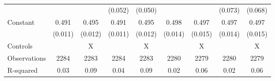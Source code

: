 {\begin{tabular}{l*{8}{c}}
                    &                     &                     &     (0.052)         &     (0.050)         &                     &                     &     (0.073)         &     (0.068)         \\
Constant            &       0.491\sym{***}&       0.495\sym{***}&       0.491\sym{***}&       0.495\sym{***}&       0.498\sym{***}&       0.497\sym{***}&       0.497\sym{***}&       0.497\sym{***}\\
                    &     (0.011)         &     (0.012)         &     (0.011)         &     (0.012)         &     (0.014)         &     (0.015)         &     (0.014)         &     (0.015)         \\
\hline
Controls            &                     &           X         &                     &           X         &                     &           X         &                     &           X         \\
Observations        &        2284         &        2283         &        2284         &        2283         &        2280         &        2279         &        2280         &        2279         \\
R-squared           &        0.03         &        0.09         &        0.04         &        0.09         &        0.02         &        0.06         &        0.02         &        0.06         \\
\hline\hline
\end{tabular}
}
